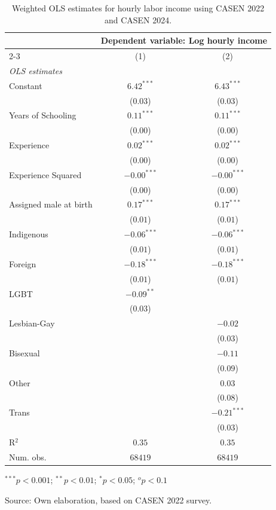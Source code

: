 \begin{table}[H]
\begin{center}
\begin{threeparttable}
\captionsetup{margin=0.5cm}
\caption{Weighted OLS estimates for hourly labor income using CASEN 2022 and CASEN 2024.}
\label{tab:MCO_CASEN}
\footnotesize
\centering
\begin{tabular}{lcc}
\toprule
 & \multicolumn{2}{c}{Dependent variable: Log hourly income} \\ 
\cline{2-3} 
 & (1) & (2) \\ \midrule
\textit{OLS estimates} &  &  \\ 
Constant & $6.42^{***}$& $6.43^{***}$ \\ 
 & ($0.03$)& ($0.03$) \\ 
Years of Schooling & $0.11^{***}$& $0.11^{***}$ \\ 
 & ($0.00$)& ($0.00$) \\ 
Experience & $0.02^{***}$& $0.02^{***}$ \\ 
 & ($0.00$)& ($0.00$) \\ 
Experience Squared & $-0.00^{***}$& $-0.00^{***}$ \\ 
 & ($0.00$)& ($0.00$) \\ 
Assigned male at birth & $0.17^{***}$& $0.17^{***}$ \\ 
 & ($0.01$)& ($0.01$) \\ 
Indigenous & $-0.06^{***}$& $-0.06^{***}$ \\ 
 & ($0.01$)& ($0.01$) \\ 
Foreign & $-0.18^{***}$& $-0.18^{***}$ \\ 
 & ($0.01$)& ($0.01$) \\ 
LGBT & $-0.09^{**}$&  \\ 
 & ($0.03$)&  \\ 
Lesbian-Gay & & $-0.02$ \\ 
 & & ($0.03$) \\ 
Bisexual & & $-0.11$ \\ 
 & & ($0.09$) \\ 
Other & & $0.03$ \\ 
 & & ($0.08$) \\ 
Trans & & $-0.21^{***}$ \\ 
 & & ($0.03$) \\ 
R$^2$ & $0.35$& $0.35$ \\ 
Num. obs. & $68419$& $68419$ \\ \bottomrule
\end{tabular}
\begin{tablenotes}
\item ${}^{***}p<0.001$; ${}^{**}p<0.01$; ${}^{*}p<0.05$; ${}^{o}p<0.1$
\item Source: Own elaboration, based on CASEN 2022 survey.
\end{tablenotes}
\end{threeparttable}
\end{center}
\end{table}